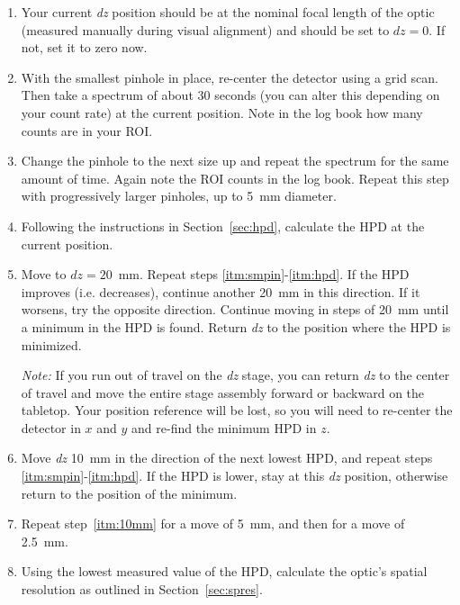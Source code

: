 \begin{enumerate}

\item Your current \textit{dz} position should be at the nominal focal length of
  the optic (measured manually during visual alignment) and should be set to
  $dz=0$. If not, set it to zero now.

\item \label{itm:smpin} With the smallest pinhole in place, re-center the
  detector using a grid scan. Then take a spectrum of about 30 seconds (you can
  alter this depending on your count rate) at the current position. Note in the
  log book how many counts are in your ROI.

\item \label{itm:nextpin} Change the pinhole to the next size up and repeat the
  spectrum for the same amount of time. Again note the ROI counts in the log
  book. Repeat this step with progressively larger pinholes, up to 5~mm
  diameter.

\item \label{itm:hpd} Following the instructions in Section~\ref{sec:hpd},
  calculate the HPD at the current position.

\item Move to $dz=20$~mm. Repeat steps \ref{itm:smpin}-\ref{itm:hpd}. If the HPD
  improves (i.e. decreases), continue another 20~mm in this direction. If it
  worsens, try the opposite direction. Continue moving in steps of 20~mm until a
  minimum in the HPD is found. Return \textit{dz} to the position where the HPD
  is minimized.

\textit{Note: }If you run out of travel on the \textit{dz} stage, you can return
\textit{dz} to the center of travel and move the entire stage assembly forward
or backward on the tabletop. Your position reference will be lost, so you will
need to re-center the detector in $x$ and $y$ and re-find the minimum HPD in
$z$.

\item \label{itm:10mm} Move \textit{dz} 10~mm in the direction of the next
  lowest HPD, and repeat steps \ref{itm:smpin}-\ref{itm:hpd}. If the HPD is
  lower, stay at this \textit{dz} position, otherwise return to the position of
  the minimum.

\item Repeat step~\ref{itm:10mm} for a move of 5~mm, and then for a move of
  2.5~mm.

\item Using the lowest measured value of the HPD, calculate the optic's spatial
  resolution as outlined in Section~\ref{sec:spres}.

\end{enumerate}

